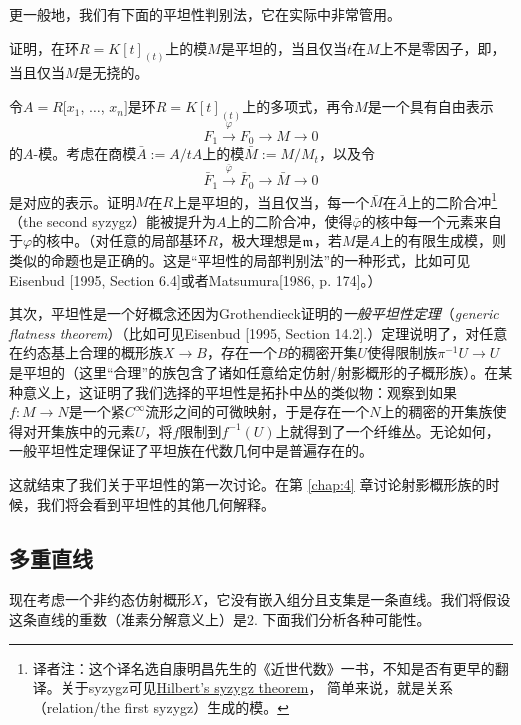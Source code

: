 更一般地，我们有下面的平坦性判别法，它在实际中非常管用。

\begin{exe}
\begin{compactenum}[(a)]
\item 证明，在环$R=K[t]_{(t)}$上的模$M$是平坦的，当且仅当$t$在$M$上不是零因子，即，当且仅当$M$是无挠的。

\item 令$A=R[x_1$, $\dots$, $x_n]$是环$R=K[t]_{(t)}$上的多项式，再令$M$是一个具有自由表示
\[
	F_1\xrightarrow{\varphi}F_0\to M\to 0
\]
的$A$\hyp 模。考虑在商模$\bar{A}:=A/tA$上的模$\bar{M}:= M/M_t$，以及令
\[
	\bar{F}_1\xrightarrow{\bar{\varphi}}\bar{F}_0\to \bar{M}\to 0
\]
是对应的表示。证明$M$在$R$上是平坦的，当且仅当，每一个$\bar{M}$在$\bar{A}$上的二阶合冲\footnote{译者注：这个译名选自康明昌先生的《近世代数》一书，不知是否有更早的翻译。关于syzygz可见\href{https://en.wikipedia.org/wiki/Hilbert\%27s_syzygy_theorem\#Sygyzies_.28relations.29}{Hilbert's syzygz theorem}， 简单来说，就是关系（relation/the first syzygz）生成的模。}（the second syzygz）能被提升为$A$上的二阶合冲，使得$\bar{\varphi}$的核中每一个元素来自于$\varphi$的核中。（对任意的局部基环$R$，极大理想是$\mathfrak{m}$，若$M$是$A$上的有限生成模，则类似的命题也是正确的。这是“平坦性的局部判别法”的一种形式，比如可见Eisenbud [1995, Section 6.4]或者Matsumura[1986, p. 174]。）
\end{compactenum}
\end{exe}

其次，平坦性是一个好概念还因为Grothendieck证明的\textit{一般平坦性定理}（{\it generic flatness theorem}）（比如可见Eisenbud [1995, Section 14.2].）定理说明了，对任意在约态基上合理的概形族$X\to B$，存在一个$B$的稠密开集$U$使得限制族$\pi^{-1}U\to U$是平坦的（这里“合理”的族包含了诸如任意给定仿射/射影概形的子概形族）。在某种意义上，这证明了我们选择的平坦性是拓扑中丛的类似物：观察到如果$f:M\to N$是一个紧$C^\infty$流形之间的可微映射，于是存在一个$N$上的稠密的开集族使得对开集族中的元素$U$，将$f$限制到$f^{-1}(U)$上就得到了一个纤维丛。无论如何，一般平坦性定理保证了平坦族在代数几何中是普遍存在的。

这就结束了我们关于平坦性的第一次讨论。在第 \ref{chap:4} 章讨论射影概形族的时候，我们将会看到平坦性的其他几何解释。

\subsection{多重直线}

现在考虑一个非约态仿射概形$X$，它没有嵌入组分且支集是一条直线。我们将假设这条直线的重数（准素分解意义上）是$2$. 下面我们分析各种可能性。

